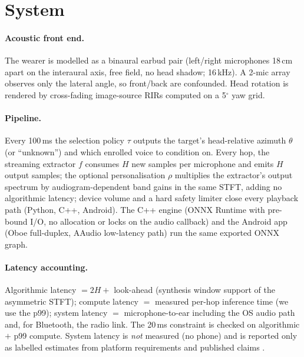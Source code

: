 \section{System}
\paragraph{Acoustic front end.} The wearer is modelled as a binaural earbud pair (left/right
microphones 18\,cm apart on the interaural axis, free field, no head shadow; 16\,kHz). A 2-mic array
observes only the lateral angle, so front/back are confounded. Head rotation is rendered by
cross-fading image-source RIRs computed on a 5$^\circ$ yaw grid.
\paragraph{Pipeline.} Every 100\,ms the selection policy $\tau$ outputs the target's head-relative
azimuth $\theta$ (or ``unknown'') and which enrolled voice to condition on. Every hop, the streaming
extractor $f$ consumes $H$ new samples per microphone and emits $H$ output samples; the optional
personalisation $\rho$ multiplies the extractor's output spectrum by audiogram-dependent band gains in
the same STFT, adding no algorithmic latency; device volume and a hard safety limiter close every
playback path (Python, C++, Android). The C++ engine (ONNX Runtime with pre-bound I/O, no allocation
or locks on the audio callback) and the Android app (Oboe full-duplex, AAudio low-latency path) run the
same exported ONNX graph.
\paragraph{Latency accounting.} Algorithmic latency $= 2H +$ look-ahead (synthesis window support of
the asymmetric STFT); compute latency $=$ measured per-hop inference time (we use the p99); system
latency $=$ microphone-to-ear including the OS audio path and, for Bluetooth, the radio link. The
20\,ms constraint is checked on algorithmic $+$ p99 compute. System latency is \emph{not} measured
(no phone) and is reported only as labelled estimates from platform requirements and published claims
\citep{androidcdd15}.
